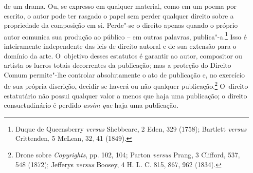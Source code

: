 de um drama. Ou, se expresso em qualquer material, como em um poema por
escrito, o autor pode ter rasgado o papel sem perder qualquer direito
sobre a propriedade da composição em si. Perde"-se o direito apenas
quando o próprio autor comunica sua produção ao público -- em outras
palavras, publica"-a.\footnote{Duque de Queensberry \emph{versus}
  Shebbeare, 2 Eden, 329 (1758); Bartlett \emph{versus} Crittenden, 5
  McLean, 32, 41 (1849).} Isso é inteiramente independente das leis de
direito autoral e de sua extensão para o domínio da arte. O~objetivo
desses estatutos é garantir ao autor, compositor ou artista os lucros
totais decorrentes da publicação; mas a proteção do Direito Comum
permite"-lhe controlar absolutamente o ato de publicação e, no exercício
de sua própria discrição, decidir se haverá ou não qualquer
publicação.\footnote{Drone sobre \emph{Copyrights}, pp. 102, 104; Parton
  \emph{versus} Prang, 3 Clifford, 537, 548 (1872); Jefferys
  \emph{versus} Boosey, 4 H. L. C. 815, 867, 962 (1834).} O~direito
estatutário não possui qualquer valor a menos que haja uma publicação; o
direito consuetudinário é perdido \emph{assim que} haja uma publicação.

